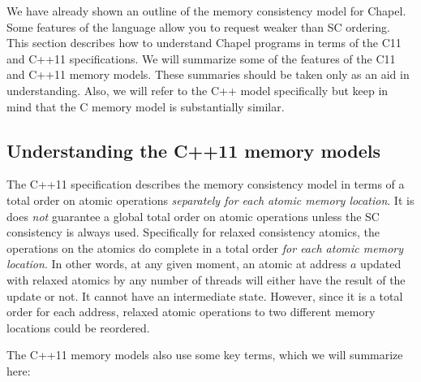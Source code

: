 We have already shown an outline of the memory consistency model for Chapel.
Some features of the language allow you to request weaker than SC ordering.
This section describes how to understand Chapel programs in terms of the C11
and C++11 specifications. We will summarize some of the features of the C11 and
C++11 memory models. These summaries should be taken only as an aid in
understanding. Also, we will refer to the C++ model specifically but keep
in mind that the C memory model is substantially similar.

\subsection{Understanding the C++11 memory models}

The C++11 specification describes the memory consistency model in terms of a
total order on atomic operations \textit{separately for each atomic memory
location}. It is does \textit{not} guarantee a global total order on atomic
operations unless the SC consistency is always used. Specifically for relaxed
consistency atomics, the operations on the atomics do complete in a total order
\textit{for each atomic memory location}.  In other words, at any given moment,
an atomic at address $a$ updated with relaxed atomics by any number of threads
will either have the result of the update or not. It cannot have an
intermediate state. However, since it is a total order for each address,
relaxed atomic operations to two different memory locations could be reordered.

The C++11 memory models also use some key terms, which we will summarize here:

